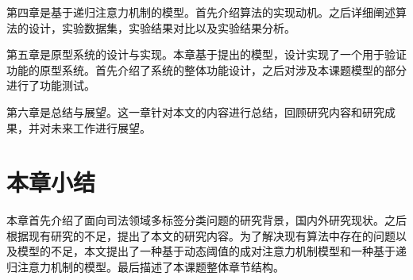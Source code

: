 第四章是基于递归注意力机制的模型。首先介绍算法的实现动机。之后详细阐述算法的设计，实验数据集，实验结果对比以及实验结果分析。

第五章是原型系统的设计与实现。本章基于提出的模型，设计实现了一个用于验证功能的原型系统。首先介绍了系统的整体功能设计，之后对涉及本课题模型的部分进行了功能测试。

第六章是总结与展望。这一章针对本文的内容进行总结，回顾研究内容和研究成果，并对未来工作进行展望。


\section{本章小结}
本章首先介绍了面向司法领域多标签分类问题的研究背景，国内外研究现状。之后根据现有研究的不足，提出了本文的研究内容。为了解决现有算法中存在的问题以及模型的不足，本文提出了一种基于动态阈值的成对注意力机制模型和一种基于递归注意力机制的模型。最后描述了本课题整体章节结构。


